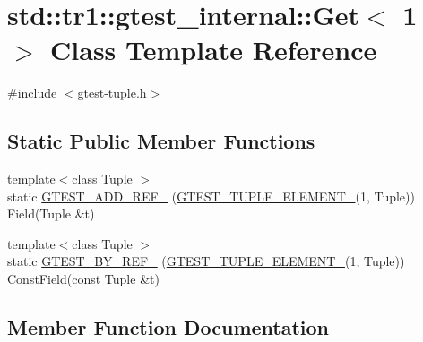 \hypertarget{classstd_1_1tr1_1_1gtest__internal_1_1_get_3_011_01_4}{}\section{std\+:\+:tr1\+:\+:gtest\+\_\+internal\+:\+:Get$<$ 1 $>$ Class Template Reference}
\label{classstd_1_1tr1_1_1gtest__internal_1_1_get_3_011_01_4}


{\ttfamily \#include $<$gtest-\/tuple.\+h$>$}

\subsection*{Static Public Member Functions}
\begin{DoxyCompactItemize}
\item 
{\footnotesize template$<$class Tuple $>$ }\\static \hyperlink{classstd_1_1tr1_1_1gtest__internal_1_1_get_3_011_01_4_a52b2f5d2bc283d76a3e8dede84dba154}{G\+T\+E\+S\+T\+\_\+\+A\+D\+D\+\_\+\+R\+E\+F\+\_\+} (\hyperlink{gtest-tuple_8h_a1b7f133d8aa02e0b7afed7b66781eeb7}{G\+T\+E\+S\+T\+\_\+\+T\+U\+P\+L\+E\+\_\+\+E\+L\+E\+M\+E\+N\+T\+\_\+}(1, Tuple)) Field(Tuple \&t)
\item 
{\footnotesize template$<$class Tuple $>$ }\\static \hyperlink{classstd_1_1tr1_1_1gtest__internal_1_1_get_3_011_01_4_a481a2bf839c758408d46a1d0d41ff8f4}{G\+T\+E\+S\+T\+\_\+\+B\+Y\+\_\+\+R\+E\+F\+\_\+} (\hyperlink{gtest-tuple_8h_a1b7f133d8aa02e0b7afed7b66781eeb7}{G\+T\+E\+S\+T\+\_\+\+T\+U\+P\+L\+E\+\_\+\+E\+L\+E\+M\+E\+N\+T\+\_\+}(1, Tuple)) Const\+Field(const Tuple \&t)
\end{DoxyCompactItemize}


\subsection{Member Function Documentation}
